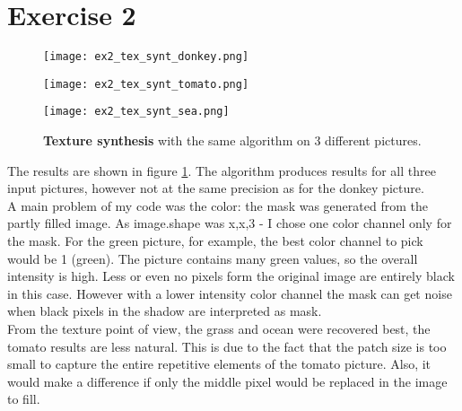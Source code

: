 \documentclass[a4paper,8pt]{extarticle}
\begin{document}
\section{Exercise 2}

\begin{figure}
  \centering
    \texttt{[image: ex2\_tex\_synt\_donkey.png]}

    \texttt{[image: ex2\_tex\_synt\_tomato.png]}

    \texttt{[image: ex2\_tex\_synt\_sea.png]}
    
  \label{fig:texsynt}
  \caption{\textbf{Texture synthesis} with the same algorithm on 3 different pictures.}
\end{figure}

The results are shown in figure \ref{fig:texsynt}. The algorithm produces results for all three input pictures, however not at the same precision as for the donkey picture. \\
A main problem of my code was the color: the mask was generated from the partly filled image. As image.shape was x,x,3 - I chose one color channel only for the mask. For the green picture, for example, the best color channel to pick would be 1 (green). The picture contains many green values, so the overall intensity is high. Less or even no pixels form the original image are entirely black in this case. However with a lower intensity color channel the mask can get noise when black pixels in the shadow are interpreted as mask.\\
From the texture point of view, the grass and ocean were recovered best, the tomato results are less natural. This is due to the fact that the patch size is too small to capture the entire repetitive elements of the tomato picture. Also, it would make a difference if only the middle pixel would be replaced in the image to fill.

\end{document}
